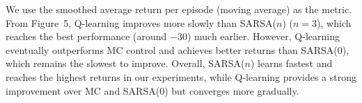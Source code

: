 \documentclass{article}
\begin{document}
\begin{enumerate}
    We use the smoothed average return per episode (moving average) as the metric. From Figure~5, Q-learning improves more slowly than SARSA($n$) ($n=3$), which reaches the best performance (around $-30$) much earlier. However, Q-learning eventually outperforms MC control and achieves better returns than SARSA(0), which remains the slowest to improve. Overall, SARSA($n$) learns fastest and reaches the highest returns in our experiments, while Q-learning provides a strong improvement over MC and SARSA(0) but converges more gradually.
        

\end{enumerate}
\end{document}
